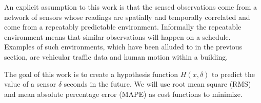 An explicit assumption to this work is that the sensed observations come from a network of sensors whose readings are spatially and temporally correlated and come from a repeatably predictable environment.  Informally the repeatable environment means that similar observations will happen on a schedule.  Examples of such environments, which have been alluded to in the previous section, are vehicular traffic data and human motion within a building.  


The goal of this work is to create a hypothesis function $H(x, \delta)$ to predict the value of a sensor $\delta$ seconds in the future.  We will use root mean square (RMS) and mean absolute percentage error (MAPE) as cost functions to minimize.







